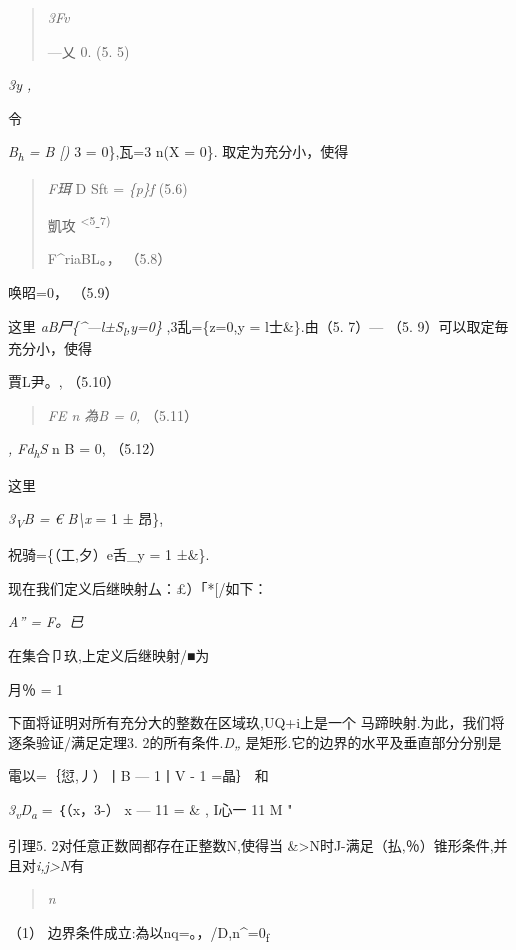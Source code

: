 \documentclass{article}
\begin{document}
\begin{quote}
\emph{3Fv}

---乂 0. (5. 5)
\end{quote}

\emph{3y ,}

令

\emph{B\textsubscript{h} = B {[})} 3 = 0\},瓦=3 n(X = 0\}.
取定为充分小，使得

\begin{quote}
\emph{F珥} D Sft = \emph{\{p\}f} (5.6)

凱攻 \textsuperscript{\textless{}5}-\textsuperscript{7)}

F\^{}riaBL。， （5.8）
\end{quote}

唤昭=0， （5.9）

这里 \emph{aB尸\{\^{}---l±S\textsubscript{l},y=0\}} ,3乱=\{z=0,y =
l士\&\}.由（5. 7）--- （5. 9）可以取定毎充分小，使得

賈L尹。, （5.10）

\begin{quote}
\emph{FE n 為B = 0,} （5.11）
\end{quote}

\emph{, Fd\textsubscript{h}S} n B = 0, （5.12）

这里

\emph{3\textsubscript{V}B = € B\textbackslash{}x} = 1 ± 昂\},

祝骑=\{（工,夕）e舌\textbar{}\_y = 1 ±\&\}.

现在我们定义后继映射厶：£）「*{[}/如下：

\emph{A'' = F。已}

在集合卩玖,上定义后继映射/■为

月％ = 1

下面将证明对所有充分大的整数在区域玖,UQ+i上是一个
马蹄映射.为此，我们将逐条验证/满足定理3. 2的所有条件.\emph{D„}
是矩形.它的边界的水平及垂直部分分别是

電以=｛愆,丿）丨B --- 1丨V - 1\textbar{} =晶｝ 和

\emph{3\textsubscript{v}D\textsubscript{a}} = ｛（x，3-） \textbar{}
\textbar{}x --- 11 = \& , I心一 11 M "

引理5. 2对任意正数岡都存在正整数N,使得当
\&\textgreater{}N时J-满足（払,％）锥形条件,并且对\emph{i,j\textgreater{}N}有

\begin{quote}
\emph{n}
\end{quote}

（1） 边界条件成立:為以nq=。，/D,n\^{}=0\textsubscript{f}
\end{document}

